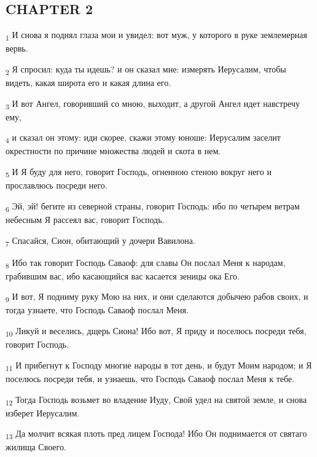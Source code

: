 \subsection{CHAPTER 2}
\begin{tcolorbox}
\textsubscript{1} И снова я поднял глаза мои и увидел: вот муж, у которого в руке землемерная вервь.
\end{tcolorbox}
\begin{tcolorbox}
\textsubscript{2} Я спросил: куда ты идешь? и он сказал мне: измерять Иерусалим, чтобы видеть, какая широта его и какая длина его.
\end{tcolorbox}
\begin{tcolorbox}
\textsubscript{3} И вот Ангел, говоривший со мною, выходит, а другой Ангел идет навстречу ему,
\end{tcolorbox}
\begin{tcolorbox}
\textsubscript{4} и сказал он этому: иди скорее, скажи этому юноше: Иерусалим заселит окрестности по причине множества людей и скота в нем.
\end{tcolorbox}
\begin{tcolorbox}
\textsubscript{5} И Я буду для него, говорит Господь, огненною стеною вокруг него и прославлюсь посреди него.
\end{tcolorbox}
\begin{tcolorbox}
\textsubscript{6} Эй, эй! бегите из северной страны, говорит Господь: ибо по четырем ветрам небесным Я рассеял вас, говорит Господь.
\end{tcolorbox}
\begin{tcolorbox}
\textsubscript{7} Спасайся, Сион, обитающий у дочери Вавилона.
\end{tcolorbox}
\begin{tcolorbox}
\textsubscript{8} Ибо так говорит Господь Саваоф: для славы Он послал Меня к народам, грабившим вас, ибо касающийся вас касается зеницы ока Его.
\end{tcolorbox}
\begin{tcolorbox}
\textsubscript{9} И вот, Я подниму руку Мою на них, и они сделаются добычею рабов своих, и тогда узнаете, что Господь Саваоф послал Меня.
\end{tcolorbox}
\begin{tcolorbox}
\textsubscript{10} Ликуй и веселись, дщерь Сиона! Ибо вот, Я приду и поселюсь посреди тебя, говорит Господь.
\end{tcolorbox}
\begin{tcolorbox}
\textsubscript{11} И прибегнут к Господу многие народы в тот день, и будут Моим народом; и Я поселюсь посреди тебя, и узнаешь, что Господь Саваоф послал Меня к тебе.
\end{tcolorbox}
\begin{tcolorbox}
\textsubscript{12} Тогда Господь возьмет во владение Иуду, Свой удел на святой земле, и снова изберет Иерусалим.
\end{tcolorbox}
\begin{tcolorbox}
\textsubscript{13} Да молчит всякая плоть пред лицем Господа! Ибо Он поднимается от святаго жилища Своего.
\end{tcolorbox}
